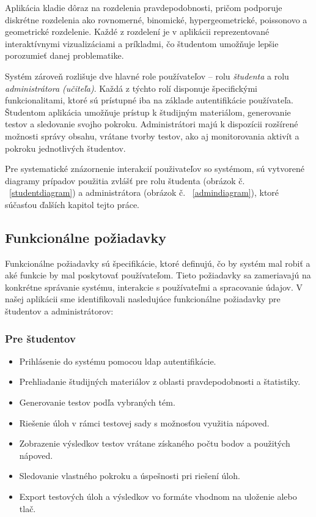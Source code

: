 Aplikácia kladie dôraz na rozdelenia pravdepodobnosti, pričom podporuje diskrétne rozdelenia ako rovnomerné, binomické, hypergeometrické, poissonovo a geometrické rozdelenie.
 Každé z rozdelení je v aplikácii reprezentované interaktívnymi vizualizáciami a príkladmi, čo študentom umožňuje lepšie porozumieť danej problematike.

Systém zároveň rozlišuje dve hlavné role používateľov – rolu \textit{študenta} a rolu \textit{administrátora (učiteľa)}. Každá z týchto rolí disponuje špecifickými funkcionalitami, ktoré sú prístupné iba na základe autentifikácie používateľa.
 Študentom aplikácia umožňuje prístup k študijným materiálom, generovanie testov a sledovanie svojho pokroku.
  Administrátori majú k dispozícii rozšírené možnosti správy obsahu, vrátane tvorby testov, ako aj monitorovania aktivít a pokroku jednotlivých študentov.

  Pre systematické znázornenie interakcií použivateľov so systémom, sú vytvorené diagramy prípadov použitia zvlášť pre rolu študenta (obrázok č. ~\ref{studentdiagram}) a administrátora (obrázok č. ~\ref{admindiagram}), ktoré súčasťou ďalších kapitol tejto práce.

\subsection{Funkcionálne požiadavky}
Funkcionálne požiadavky sú špecifikácie, ktoré definujú, čo by systém mal robiť a aké funkcie by mal poskytovať používateľom.
 Tieto požiadavky sa zameriavajú na konkrétne správanie systému, interakcie s používateľmi a spracovanie údajov. 
 V našej aplikácii sme identifikovali nasledujúce funkcionálne požiadavky pre študentov a administrátorov:
 \subsubsection{Pre študentov}
 \begin{itemize}
   \item Prihlásenie do systému pomocou \acrshort{ldap} autentifikácie.
   \item Prehliadanie študijných materiálov z oblasti pravdepodobnosti a štatistiky.
   \item Generovanie testov podľa vybraných tém.
   \item Riešenie úloh v rámci testovej sady s možnosťou využitia nápoved.
   \item Zobrazenie výsledkov testov vrátane získaného počtu bodov a použitých nápoved.
   \item Sledovanie vlastného pokroku a úspešnosti pri riešení úloh.
   \item Export testových úloh a výsledkov vo formáte vhodnom na uloženie alebo tlač.
 \end{itemize}
 
